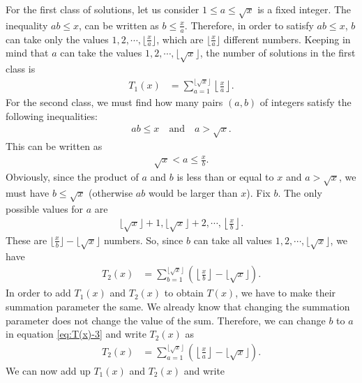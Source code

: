 \documentclass[12pt]{subfile}
\begin{document}
For the first class of solutions, let us consider $1 \leq a \leq \sqrt x$ is a fixed integer. The inequality $ab \leq x$, can be written as $b \leq \frac{x}{a}$. Therefore, in order to satisfy $ab \leq x$, $b$ can take only the values $1, 2,\cdots,\lfloor \frac{x}{a}\rfloor$, which are $\lfloor \frac{x}{a}\rfloor$ different numbers. Keeping in mind that $a$ can take the values $1, 2, \cdots, \lfloor \sqrt x \rfloor$, the number of solutions in the first class is
	\begin{align*}
		T_1(x) &= \sum_{a=1}^{\lfloor\sqrt x\rfloor} \left\lfloor\frac{x}{a}\right\rfloor.
	\end{align*}
For the second class, we must find how many pairs $(a,b)$ of integers satisfy the following inequalities:
	\begin{align*}
		ab \leq x \quad \text{and} \quad a > \sqrt x.
	\end{align*}
This can be written as
	\begin{align*}
		\sqrt x < a \leq \frac{x}{b}.
	\end{align*}
Obviously, since the product of $a$ and $b$ is less than or equal to $x$ and $a > \sqrt x$, we must have $b \leq \sqrt x$ (otherwise $ab$ would be larger than $x$). Fix $b$. The only possible values for $a$ are
	\begin{align*}
		\lfloor \sqrt x \rfloor +1, \lfloor \sqrt x \rfloor +2, \cdots, \left\lfloor \frac{x}{b}\right\rfloor.
	\end{align*}
These are $\lfloor \frac{x}{b}\rfloor - \lfloor \sqrt x \rfloor$ numbers. So, since $b$ can take all values $1, 2, \cdots, \lfloor \sqrt x \rfloor$, we have
	\begin{align}
		T_2(x) &= \sum_{b=1}^{\lfloor\sqrt x\rfloor} \left(\left\lfloor\frac{x}{b}\right\rfloor - \lfloor \sqrt x \rfloor\right). \label{eq:T(x)-3}
	\end{align}
In order to add $T_1(x)$ and $T_2(x)$ to obtain $T(x)$, we have to make their summation parameter the same. We already know that changing the summation parameter does not change the value of the sum. Therefore, we can change $b$ to $a$ in equation \ref{eq:T(x)-3} and write $T_2(x)$ as
	\begin{align*}
		T_2(x) &= \sum_{a=1}^{\lfloor\sqrt x\rfloor} \left(\left\lfloor\frac{x}{a}\right\rfloor - \lfloor \sqrt x \rfloor\right).
	\end{align*}
We can now add up $T_1(x)$ and $T_2(x)$ and write
\end{document}
